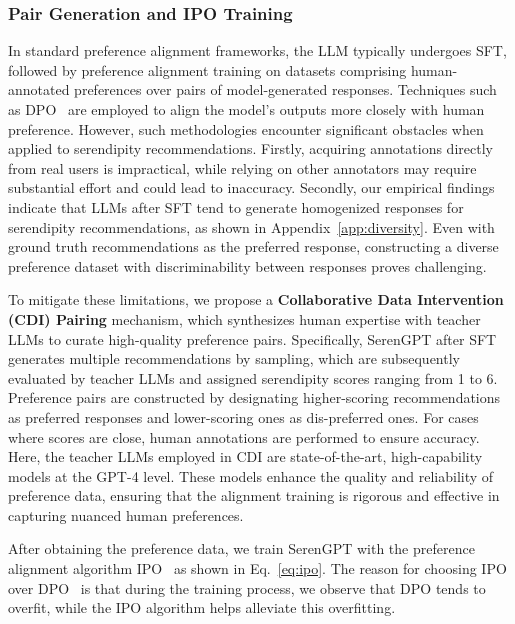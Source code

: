 \subsubsection{Pair Generation and IPO Training}
In standard preference alignment frameworks, the LLM typically undergoes SFT, followed by preference alignment training on datasets comprising human-annotated preferences over pairs of model-generated responses. Techniques such as DPO~\cite{rafailov2024direct} are employed to align the model's outputs more closely with human preference. However, such methodologies encounter significant obstacles when applied to serendipity recommendations. Firstly, acquiring annotations directly from real users is impractical, while relying on other annotators may require substantial effort and could lead to inaccuracy. Secondly, our empirical findings indicate that LLMs after SFT tend to generate homogenized responses for serendipity recommendations, as shown in Appendix~\ref{app:diversity}. Even with ground truth recommendations as the preferred response, constructing a diverse preference dataset with discriminability between responses proves challenging.

To mitigate these limitations, we propose a \textbf{Collaborative Data Intervention (CDI) Pairing} mechanism, which synthesizes human expertise with teacher LLMs to curate high-quality preference pairs. Specifically, SerenGPT after SFT generates multiple recommendations by sampling, which are subsequently evaluated by teacher LLMs and assigned serendipity scores ranging from 1 to 6. Preference pairs are constructed by designating higher-scoring recommendations as preferred responses and lower-scoring ones as dis-preferred ones. For cases where scores are close, human annotations are performed to ensure accuracy. Here, the teacher LLMs employed in CDI are state-of-the-art, high-capability models at the GPT-4 level. These models enhance the quality and reliability of preference data, ensuring that the alignment training is rigorous and effective in capturing nuanced human preferences.

After obtaining the preference data, we train SerenGPT with the preference alignment algorithm IPO~\cite{azar2024general} as shown in Eq.~\eqref{eq:ipo}. The reason for choosing IPO over DPO~\cite{rafailov2024direct} is that during the training process, we observe that DPO tends to overfit, while the IPO algorithm helps alleviate this overfitting.

